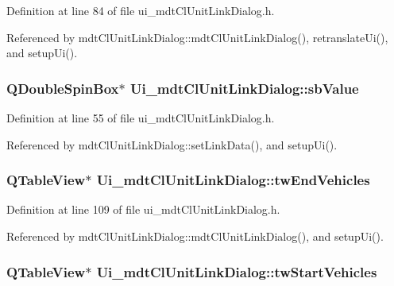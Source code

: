 Definition at line 84 of file ui\-\_\-mdt\-Cl\-Unit\-Link\-Dialog.\-h.



Referenced by mdt\-Cl\-Unit\-Link\-Dialog\-::mdt\-Cl\-Unit\-Link\-Dialog(), retranslate\-Ui(), and setup\-Ui().

\hypertarget{class_ui__mdt_cl_unit_link_dialog_ac580c8a87b8a782c115e955752038e6a}{
\subsubsection[{sb\-Value}]{\setlength{\rightskip}{0pt plus 5cm}Q\-Double\-Spin\-Box$\ast$ Ui\-\_\-mdt\-Cl\-Unit\-Link\-Dialog\-::sb\-Value}}\label{class_ui__mdt_cl_unit_link_dialog_ac580c8a87b8a782c115e955752038e6a}


Definition at line 55 of file ui\-\_\-mdt\-Cl\-Unit\-Link\-Dialog.\-h.



Referenced by mdt\-Cl\-Unit\-Link\-Dialog\-::set\-Link\-Data(), and setup\-Ui().

\hypertarget{class_ui__mdt_cl_unit_link_dialog_ae2fed2def3422e176f545e0fb02985bf}{
\subsubsection[{tw\-End\-Vehicles}]{\setlength{\rightskip}{0pt plus 5cm}Q\-Table\-View$\ast$ Ui\-\_\-mdt\-Cl\-Unit\-Link\-Dialog\-::tw\-End\-Vehicles}}\label{class_ui__mdt_cl_unit_link_dialog_ae2fed2def3422e176f545e0fb02985bf}


Definition at line 109 of file ui\-\_\-mdt\-Cl\-Unit\-Link\-Dialog.\-h.



Referenced by mdt\-Cl\-Unit\-Link\-Dialog\-::mdt\-Cl\-Unit\-Link\-Dialog(), and setup\-Ui().

\hypertarget{class_ui__mdt_cl_unit_link_dialog_a1a12761bd3b7fb3d574e790013e29267}{
\subsubsection[{tw\-Start\-Vehicles}]{\setlength{\rightskip}{0pt plus 5cm}Q\-Table\-View$\ast$ Ui\-\_\-mdt\-Cl\-Unit\-Link\-Dialog\-::tw\-Start\-Vehicles}}\label{class_ui__mdt_cl_unit_link_dialog_a1a12761bd3b7fb3d574e790013e29267}


